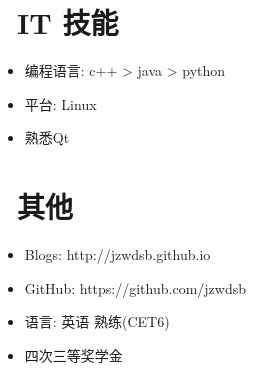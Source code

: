 \documentclass{resume}
\begin{document}

\section{\faCogs\ IT 技能}
\begin{itemize}[parsep=0.5ex]
  \item 编程语言: c++ > java > python
  \item 平台: Linux
  \item 熟悉Qt
\end{itemize}

\section{\faInfo\ 其他}
\begin{itemize}[parsep=0.5ex]
  \item Blogs: http://jzwdsb.github.io
  \item GitHub: https://github.com/jzwdsb
  \item 语言: 英语 熟练(CET6)
  \item 四次三等奖学金
\end{itemize}

%
%
\end{document}
